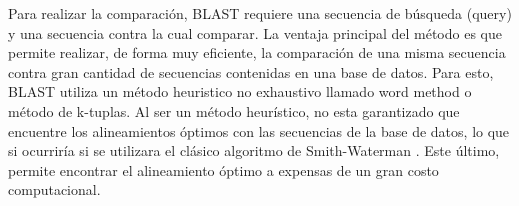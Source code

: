 






Para realizar la comparación, BLAST requiere una secuencia de búsqueda (query) y una secuencia contra la cual comparar.
La ventaja principal del método es que permite realizar, de forma muy eficiente, la comparación de una misma secuencia contra gran cantidad de secuencias contenidas en una base de datos.
Para esto, BLAST utiliza un método heuristico no exhaustivo llamado word method o método de k-tuplas.
Al ser un método heurístico, no esta garantizado que encuentre los alineamientos óptimos con las secuencias de la base de datos, lo que si ocurriría si se utilizara el clásico algoritmo de Smith-Waterman \cite{smith1981identification}.
Este último, permite encontrar el alineamiento óptimo a expensas de un gran costo computacional.

